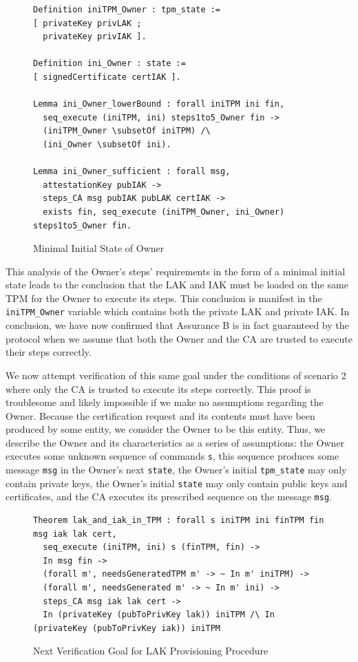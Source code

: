 \documentclass[runningheads]{llncs}
\begin{document}
\begin{figure}[hbtp]
\begin{lstlisting}[language=Coq]
Definition iniTPM_Owner : tpm_state :=
[ privateKey privLAK ;
  privateKey privIAK ].

Definition ini_Owner : state :=
[ signedCertificate certIAK ].

Lemma ini_Owner_lowerBound : forall iniTPM ini fin,
  seq_execute (iniTPM, ini) steps1to5_Owner fin ->
  (iniTPM_Owner \subsetOf iniTPM) /\
  (ini_Owner \subsetOf ini).

Lemma ini_Owner_sufficient : forall msg,
  attestationKey pubIAK ->
  steps_CA msg pubIAK pubLAK certIAK ->
  exists fin, seq_execute (iniTPM_Owner, ini_Owner) steps1to5_Owner fin.
\end{lstlisting}
\caption{Minimal Initial State of Owner}
\end{figure}

This analysis of the Owner's steps' requirements in the form of a
minimal initial state leads to the conclusion that the LAK and IAK
must be loaded on the same TPM for the Owner to execute its
steps. This conclusion is manifest in the \verb|iniTPM_Owner| variable
which contains both the private LAK and private IAK. In conclusion, we
have now confirmed that Assurance B is in fact guaranteed by the
protocol when we assume that both the Owner and the CA are trusted to
execute their steps correctly.

We now attempt verification of this same goal under the conditions of
scenario 2 where only the CA is trusted to execute its steps
correctly. This proof is troublesome and likely impossible if we make
no assumptions regarding the Owner.  Because the certification request
and its contents must have been produced by some entity, we consider
the Owner to be this entity.  Thus, we describe the Owner and its
characteristics as a series of assumptions: the Owner executes some
unknown sequence of commands \verb|s|, this sequence produces some
message \verb|msg| in the Owner's next \verb|state|, the Owner's
initial \verb|tpm_state| may only contain private keys, the Owner's
initial \verb|state| may only contain public keys and certificates,
and the CA executes its prescribed sequence on the message \verb|msg|.

\begin{figure}[hbtp]
\begin{lstlisting}[language=Coq]
Theorem lak_and_iak_in_TPM : forall s iniTPM ini finTPM fin msg iak lak cert,
  seq_execute (iniTPM, ini) s (finTPM, fin) -> 
  In msg fin ->
  (forall m', needsGeneratedTPM m' -> ~ In m' iniTPM) ->
  (forall m', needsGenerated m' -> ~ In m' ini) ->
  steps_CA msg iak lak cert ->
  In (privateKey (pubToPrivKey lak)) iniTPM /\ In (privateKey (pubToPrivKey iak)) iniTPM
\end{lstlisting}
\caption{Next Verification Goal for LAK Provisioning Procedure}
\label{fig:lak_goal}
\end{figure}
\end{document}
